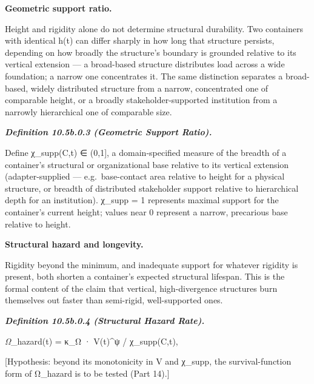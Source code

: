 \documentclass[
]{article}
\begin{document}
\textbf{Geometric support ratio.}

Height and rigidity alone do not determine structural durability. Two
containers with identical h(t) can differ sharply in how long that
structure persists, depending on how broadly the structure's boundary is
grounded relative to its vertical extension --- a broad-based structure
distributes load across a wide foundation; a narrow one concentrates it.
The same distinction separates a broad-based, widely distributed
structure from a narrow, concentrated one of comparable height, or a
broadly stakeholder-supported institution from a narrowly hierarchical
one of comparable size.

\emph{\textbf{Definition 10.5b.0.3 (Geometric Support Ratio).}}

Define χ\_supp(C,t) ∈ (0,1{]}, a domain-specified measure of the breadth
of a container's structural or organizational base relative to its
vertical extension (adapter-supplied --- e.g.~base-contact area relative
to height for a physical structure, or breadth of distributed
stakeholder support relative to hierarchical depth for an institution).
χ\_supp = 1 represents maximal support for the container's current
height; values near 0 represent a narrow, precarious base relative to
height.

\textbf{Structural hazard and longevity.}

Rigidity beyond the minimum, and inadequate support for whatever
rigidity is present, both shorten a container's expected structural
lifespan. This is the formal content of the claim that vertical,
high-divergence structures burn themselves out faster than semi-rigid,
well-supported ones.

\emph{\textbf{Definition 10.5b.0.4 (Structural Hazard Rate).}}

\emph{Ω}\_hazard(t) = κ\_Ω · V(t)\^{}ψ / χ\_supp(C,t),

{[}Hypothesis: beyond its monotonicity in V and χ\_supp, the
survival-function form of Ω\_hazard is to be tested (Part 14).{]}
\end{document}
